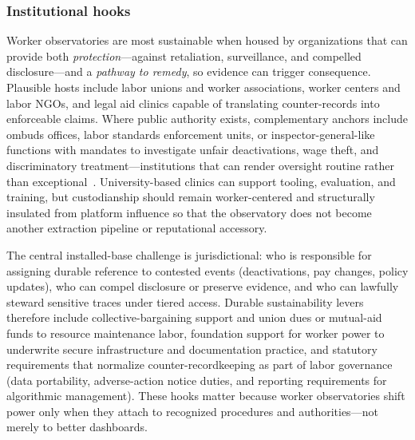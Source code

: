 \documentclass[acmsmall,screen]{acmart}
\begin{document}
\subsubsection*{Institutional hooks}
Worker observatories are most sustainable when housed by organizations that can provide both \emph{protection}---against retaliation, surveillance, and compelled disclosure---and a \emph{pathway to remedy}, so evidence can trigger consequence. Plausible hosts include labor unions and worker associations, worker centers and labor NGOs, and legal aid clinics capable of translating counter-records into enforceable claims. Where public authority exists, complementary anchors include ombuds offices, labor standards enforcement units, or inspector-general-like functions with mandates to investigate unfair deactivations, wage theft, and discriminatory treatment---institutions that can render oversight routine rather than exceptional~\cite{jarrahiAlgorithmicManagementWork2021,calacciBargainingBlackBoxDesigning2022}. University-based clinics can support tooling, evaluation, and training, but custodianship should remain worker-centered and structurally insulated from platform influence so that the observatory does not become another extraction pipeline or reputational accessory.

The central installed-base challenge is jurisdictional: who is responsible for assigning durable reference to contested events (deactivations, pay changes, policy updates), who can compel disclosure or preserve evidence, and who can lawfully steward sensitive traces under tiered access. Durable sustainability levers therefore include collective-bargaining support and union dues or mutual-aid funds to resource maintenance labor, foundation support for worker power to underwrite secure infrastructure and documentation practice, and statutory requirements that normalize counter-recordkeeping as part of labor governance (data portability, adverse-action notice duties, and reporting requirements for algorithmic management). These hooks matter because worker observatories shift power only when they attach to recognized procedures and authorities---not merely to better dashboards.
\end{document}
